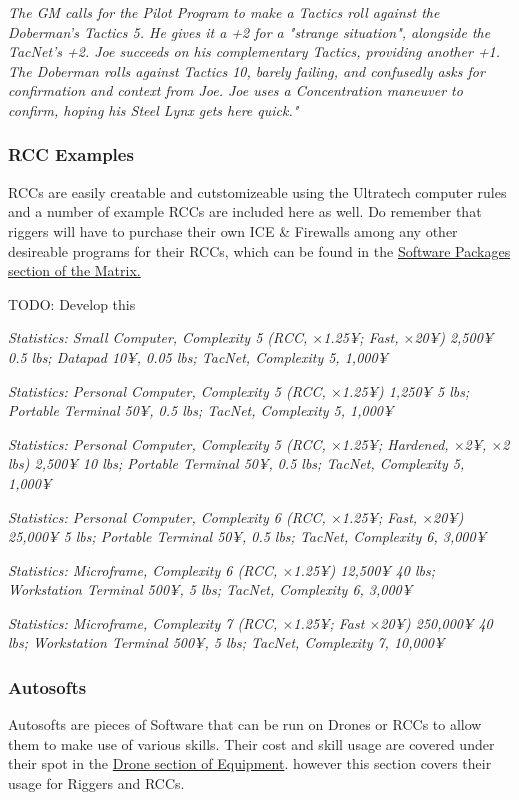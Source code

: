\begin{multicols*}{3}
	\textcolor{OliveGreen}{\textit{The GM calls for the Pilot Program to make a Tactics roll against the Doberman's Tactics 5. He gives it a +2 for a "strange situation", alongside the TacNet's +2. Joe succeeds on his complementary Tactics, providing another +1. The Doberman rolls against Tactics 10, barely failing, and confusedly asks for confirmation and context from Joe. Joe uses a Concentration maneuver to confirm, hoping his Steel Lynx gets here quick."}}
	
	\subsubsection{RCC Examples}
	
	RCCs are easily creatable and cutstomizeable using the Ultratech computer rules and a number of example RCCs are included here as well. Do remember that riggers will have to purchase their own ICE \& Firewalls among any other desireable programs for their RCCs, which can be found in the \hyperref[software_packages]{Software Packages section of the Matrix.}
	
	TODO: Develop this
	
	\textcolor{OliveGreen}{\textit{Statistics: Small Computer, Complexity 5 (RCC, \(\times\)1.25¥; Fast, \(\times\)20¥) 2,500¥ 0.5 lbs; Datapad 10¥, 0.05 lbs; TacNet, Complexity 5, 1,000¥}}
	
	\textcolor{OliveGreen}{\textit{Statistics: Personal Computer, Complexity 5 (RCC, \(\times\)1.25¥) 1,250¥ 5 lbs; Portable Terminal 50¥, 0.5 lbs; TacNet, Complexity 5, 1,000¥}}
	
	\textcolor{OliveGreen}{\textit{Statistics: Personal Computer, Complexity 5 (RCC, \(\times\)1.25¥; Hardened, \(\times\)2¥, \(\times\)2 lbs) 2,500¥ 10 lbs; Portable Terminal 50¥, 0.5 lbs; TacNet, Complexity 5, 1,000¥}}
	
	\textcolor{OliveGreen}{\textit{Statistics: Personal Computer, Complexity 6 (RCC, \(\times\)1.25¥; Fast, \(\times\)20¥) 25,000¥ 5 lbs; Portable Terminal 50¥, 0.5 lbs; TacNet, Complexity 6, 3,000¥}}
	
	\textcolor{OliveGreen}{\textit{Statistics: Microframe, Complexity 6 (RCC, \(\times\)1.25¥) 12,500¥ 40 lbs; Workstation Terminal 500¥, 5 lbs; TacNet, Complexity 6, 3,000¥}}
	
	\textcolor{OliveGreen}{\textit{Statistics: Microframe, Complexity 7 (RCC, \(\times\)1.25¥; Fast \(\times\)20¥) 250,000¥ 40 lbs; Workstation Terminal 500¥, 5 lbs; TacNet, Complexity 7, 10,000¥}}
	
	\subsubsection{Autosofts}
	Autosofts are pieces of Software that can be run on Drones or RCCs to allow them to make use of various skills. Their cost and skill usage are covered under their spot in the \hyperref[drones]{Drone section of Equipment}. however this section covers their usage for Riggers and RCCs.
	

\end{multicols*}
